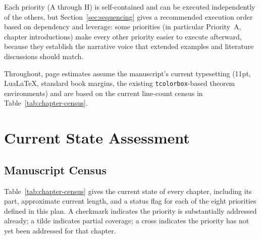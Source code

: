 \documentclass[11pt]{report}
\begin{document}
Each priority (A through H) is self-contained and can be
executed independently of the others, but Section~\ref{sec:sequencing}
gives a recommended execution order based on dependency and
leverage: some priorities (in particular Priority~A, chapter
introductions) make every other priority easier to execute
afterward, because they establish the narrative voice that
extended examples and literature discussions should match.

Throughout, page estimates assume the manuscript's current
typesetting (11pt, LuaLaTeX, standard book margins, the
existing \texttt{tcolorbox}-based theorem environments) and are
based on the current line-count census in
Table~\ref{tab:chapter-census}.

\chapter{Current State Assessment}
\label{ch:assessment}

\section{Manuscript Census}

Table~\ref{tab:chapter-census} gives the current state of every
chapter, including its part, approximate current length, and a
status flag for each of the eight priorities defined in this
plan. A checkmark indicates the priority is substantially
addressed already; a tilde indicates partial coverage; a cross
indicates the priority has not yet been addressed for that
chapter.
\end{document}
